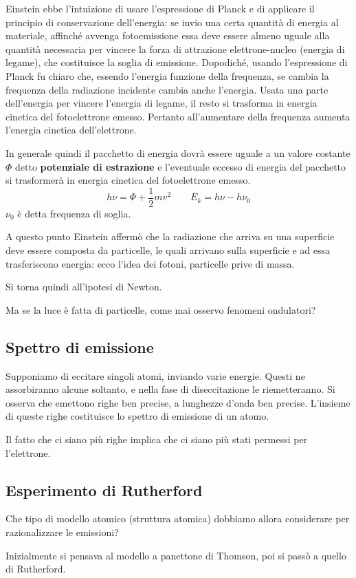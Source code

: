 Einstein ebbe l'intuizione di usare l'espressione di Planck e di applicare il principio di conservazione dell'energia: se invio una certa quantità di energia al materiale, affinché avvenga fotoemissione essa deve essere almeno uguale alla quantità necessaria per vincere la forza di attrazione elettrone-nucleo (energia di legame), che costituisce la soglia di emissione. Dopodiché, usando l'espressione di Planck fu chiaro che, essendo l'energia funzione della frequenza, se cambia la frequenza della radiazione incidente cambia anche l'energia. Usata una parte dell'energia per vincere l'energia di legame, il resto si trasforma in energia cinetica del fotoelettrone emesso.
Pertanto all'aumentare della frequenza aumenta l'energia cinetica dell'elettrone.

In generale quindi il pacchetto di energia dovrà essere uguale a un valore costante $\Phi$ detto \textbf{potenziale di estrazione} e l'eventuale eccesso di energia del pacchetto si trasformerà in energia cinetica del fotoelettrone emesso.
$$h\nu=\Phi+\frac{1}{2}mv^2 \qquad E_k=h\nu-h\nu_0$$
$\nu_0$ è detta frequenza di soglia.

A questo punto Einstein affermò che la radiazione che arriva su una superficie deve essere composta da particelle, le quali arrivano sulla superficie e ad essa trasferiscono energia: ecco l'idea dei fotoni, particelle prive di massa.

Si torna quindi all'ipotesi di Newton.

Ma se la luce è fatta di particelle, come mai osservo fenomeni ondulatori?
\subsection{Spettro di emissione}
Supponiamo di eccitare singoli atomi, inviando varie energie. Questi ne assorbiranno alcune soltanto, e nella fase di diseccitazione le riemetteranno. Si osserva che emettono righe ben precise, a lunghezze d'onda ben precise. L'insieme di queste righe costituisce lo spettro di emissione di un atomo.

Il fatto che ci siano più righe implica che ci siano più stati permessi per l'elettrone.
\subsection{Esperimento di Rutherford}
Che tipo di modello atomico (struttura atomica) dobbiamo allora considerare per razionalizzare le emissioni?

Inizialmente si pensava al modello a panettone di Thomson, poi si passò a quello di Rutherford.

